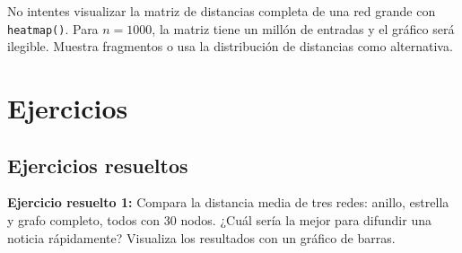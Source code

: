 \documentclass[
  letterpaper,
  DIV=11,
  numbers=noendperiod]{scrreprt}
\begin{document}
\begin{tcolorbox}[enhanced jigsaw, toprule=.15mm, colframe=quarto-callout-warning-color-frame, coltitle=black, titlerule=0mm, colback=white, breakable, leftrule=.75mm, arc=.35mm, bottomtitle=1mm, toptitle=1mm, rightrule=.15mm, bottomrule=.15mm, left=2mm, title=\textcolor{quarto-callout-warning-color}{\faExclamationTriangle}\hspace{0.5em}{⚠️ Error frecuente}, colbacktitle=quarto-callout-warning-color!10!white, opacityback=0, opacitybacktitle=0.6]

No intentes visualizar la matriz de distancias completa de una red
grande con \texttt{heatmap()}. Para \(n = 1000\), la matriz tiene un
millón de entradas y el gráfico será ilegible. Muestra fragmentos o usa
la distribución de distancias como alternativa.

\end{tcolorbox}

\section{Ejercicios}\label{ejercicios-2}

\subsection*{Ejercicios resueltos}\label{ejercicios-resueltos-2}

\textbf{Ejercicio resuelto 1:} Compara la distancia media de tres redes:
anillo, estrella y grafo completo, todos con 30 nodos. ¿Cuál sería la
mejor para difundir una noticia rápidamente? Visualiza los resultados
con un gráfico de barras.
\end{document}
